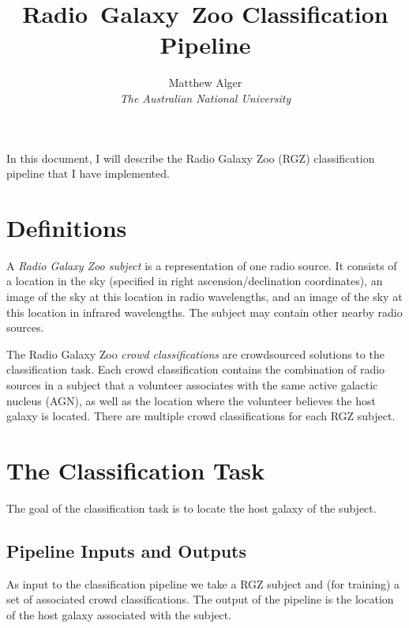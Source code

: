 \documentclass[a4paper]{article}
\begin{document}
    \title{Radio~Galaxy~Zoo Classification Pipeline}
    \author{Matthew Alger \\ \emph{The Australian National University}}
    \maketitle

    In this document, I will describe the Radio Galaxy Zoo (RGZ) classification pipeline that I have implemented.

    \section{Definitions}



        A \emph{Radio Galaxy Zoo subject} is a representation of one radio source. It consists of a location in the sky (specified in right ascension/declination coordinates), an image of the sky at this location in radio wavelengths, and an image of the sky at this location in infrared wavelengths. The subject may contain other nearby radio sources.

        The Radio Galaxy Zoo \emph{crowd classifications} are crowdsourced solutions to the classification task. Each crowd classification contains the combination of radio sources in a subject that a volunteer associates with the same active galactic nucleus (AGN), as well as the location where the volunteer believes the host galaxy is located. There are multiple crowd classifications for each RGZ subject.

    \section{The Classification Task}

        The goal of the classification task is to locate the host galaxy of the subject.

        \subsection{Pipeline Inputs and Outputs}

            As input to the classification pipeline we take a RGZ subject and (for training) a set of associated crowd classifications. The output of the pipeline is the location of the host galaxy associated with the subject.
\end{document}
